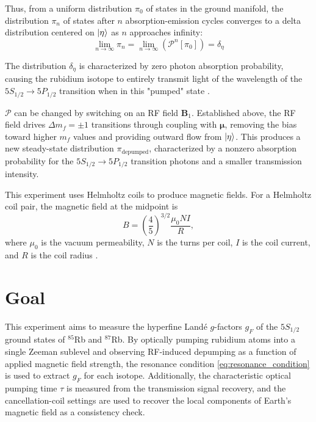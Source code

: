 \documentclass[11pt]{article}
\begin{document}
Thus, from a uniform distribution $\pi_0$ of states in the ground manifold,
the distribution $\pi_n$ of states after $n$ absorption-emission
cycles converges to a delta distribution centered on $\ket{\eta}$ as
$n$ approaches infinity:
\begin{equation}
  \lim_{n \to \infty} \pi_n = \lim_{n \to \infty} (\mathcal P^n[\pi_0]) =
  \delta_{\eta}
\end{equation}

The distribution $\delta_\eta$ is characterized by zero photon
absorption probability, causing the rubidium isotope to entirely transmit
light of the wavelength of the $5S_{1/2} \rightarrow 5P_{1/2}$
transition when in this "pumped" state \cite{harris}.

$\mathcal P$ can be changed by switching on an RF field $\mathbf{B}_1$.
Established above, the RF field drives $\Delta m_f = \pm
1$ transitions through coupling with $\mathbf{\mu}$, removing the
bias toward higher
$m_f$ values and providing outward flow from $\ket{\eta}$. This
produces a new steady-state distribution $\pi_\text{depumped}$,
characterized by a nonzero absorption probability for the $5S_{1/2} \rightarrow
5P_{1/2}$ transition photons and a smaller transmission intensity.

This experiment uses Helmholtz coils to produce magnetic fields. For
a Helmholtz coil pair, the magnetic field at the midpoint is
\begin{equation}
  B = \left(\frac{4}{5}\right)^{3/2}\frac{\mu_0 N I}{R},
  \label{eq:helmholtz_field}
\end{equation}
where $\mu_0$ is the vacuum permeability, $N$ is the turns per coil,
$I$ is the coil current, and $R$ is the coil radius \cite{helm}.

\section{Goal}

This experiment aims to measure the hyperfine Land\'{e}
$g$-factors $g_F$ of the $5S_{1/2}$ ground states of $^{85}$Rb and
$^{87}$Rb. By optically pumping rubidium atoms into a single
Zeeman sublevel and observing RF-induced depumping as a function of
applied magnetic field strength, the resonance condition
\eqref{eq:resonance_condition} is used to extract $g_F$ for each
isotope. Additionally, the characteristic optical pumping time
$\tau$ is measured from the transmission signal recovery, and the
cancellation-coil settings are used to recover the local
components of Earth's magnetic field as a consistency check.
\end{document}
